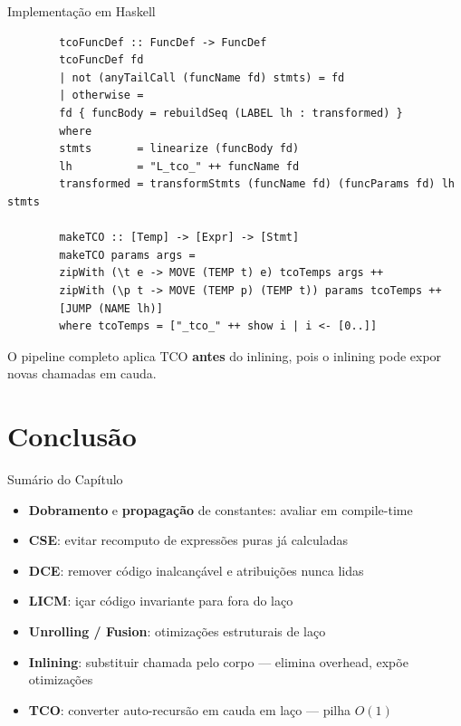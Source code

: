\begin{frame}[fragile]{Implementação em Haskell}

    \begin{lstlisting}
        tcoFuncDef :: FuncDef -> FuncDef
        tcoFuncDef fd
        | not (anyTailCall (funcName fd) stmts) = fd
        | otherwise =
        fd { funcBody = rebuildSeq (LABEL lh : transformed) }
        where
        stmts       = linearize (funcBody fd)
        lh          = "L_tco_" ++ funcName fd
        transformed = transformStmts (funcName fd) (funcParams fd) lh stmts

        makeTCO :: [Temp] -> [Expr] -> [Stmt]
        makeTCO params args =
        zipWith (\t e -> MOVE (TEMP t) e) tcoTemps args ++
        zipWith (\p t -> MOVE (TEMP p) (TEMP t)) params tcoTemps ++
        [JUMP (NAME lh)]
        where tcoTemps = ["_tco_" ++ show i | i <- [0..]]
    \end{lstlisting}

    O pipeline completo aplica TCO \textbf{antes} do inlining, pois o
    inlining pode expor novas chamadas em cauda.
\end{frame}


\section{Conclusão}\label{conclusuxe3o}

\begin{frame}{Sumário do Capítulo}

    \begin{itemize}

        \item
        \textbf{Dobramento} e \textbf{propagação} de constantes: avaliar em
        compile-time
        \item
        \textbf{CSE}: evitar recomputo de expressões puras já calculadas
        \item
        \textbf{DCE}: remover código inalcançável e atribuições nunca lidas
        \item
        \textbf{LICM}: içar código invariante para fora do laço
        \item
        \textbf{Unrolling / Fusion}: otimizações estruturais de laço
        \item
        \textbf{Inlining}: substituir chamada pelo corpo --- elimina overhead,
        expõe otimizações
        \item
        \textbf{TCO}: converter auto-recursão em cauda em laço --- pilha
        \(O(1)\)
    \end{itemize}
\end{frame}

